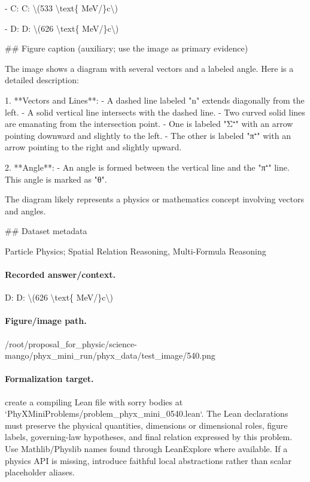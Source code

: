 - C: C: \textbackslash{}(533 \textbackslash{}text\{ MeV/\}c\textbackslash{})

- D: D: \textbackslash{}(626 \textbackslash{}text\{ MeV/\}c\textbackslash{})

\#\# Figure caption (auxiliary; use the image as primary evidence)

The image shows a diagram with several vectors and a labeled angle. Here is a detailed description:

1. **Vectors and Lines**:
   - A dashed line labeled "n" extends diagonally from the left.
   - A solid vertical line intersects with the dashed line.
   - Two curved solid lines are emanating from the intersection point. 
     - One is labeled "Σ⁺" with an arrow pointing downward and slightly to the left.
     - The other is labeled "π⁺" with an arrow pointing to the right and slightly upward.

2. **Angle**:
   - An angle is formed between the vertical line and the "π⁺" line. This angle is marked as "θ".

The diagram likely represents a physics or mathematics concept involving vectors and angles.

\#\# Dataset metadata

Particle Physics; Spatial Relation Reasoning, Multi-Formula Reasoning

\paragraph{Recorded answer/context.}
D: D: \textbackslash{}(626 \textbackslash{}text\{ MeV/\}c\textbackslash{})

\paragraph{Figure/image path.}
/root/proposal\_for\_physic/science-mango/phyx\_mini\_run/phyx\_data/test\_image/540.png

\paragraph{Formalization target.}
create a compiling Lean file with sorry bodies at `PhyXMiniProblems/problem\_phyx\_mini\_0540.lean`. The Lean declarations must preserve the physical quantities, dimensions or dimensional roles, figure labels, governing-law hypotheses, and final relation expressed by this problem.
Use Mathlib/Physlib names found through LeanExplore where available. If a physics API is missing, introduce faithful local abstractions rather than scalar placeholder aliases.

